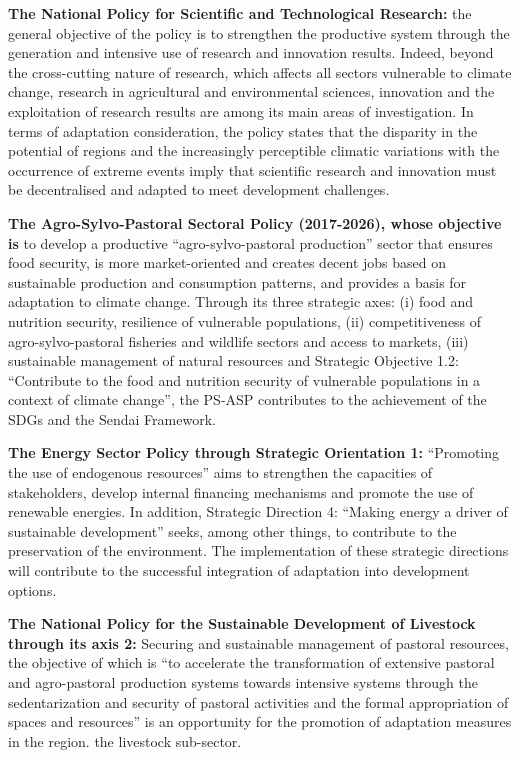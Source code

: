 \documentclass[
]{book}
\begin{document}
\textbf{The National Policy for Scientific and Technological Research:} the general objective of the policy is to strengthen the productive system through the generation and intensive use of research and innovation results. Indeed, beyond the cross-cutting nature of research, which affects all sectors vulnerable to climate change, research in agricultural and environmental sciences, innovation and the exploitation of research results are among its main areas of investigation. In terms of adaptation consideration, the policy states that the disparity in the potential of regions and the increasingly perceptible climatic variations with the occurrence of extreme events imply that scientific research and innovation must be decentralised and adapted to meet development challenges.

\textbf{The Agro-Sylvo-Pastoral Sectoral Policy (2017-2026), whose objective is} to develop a productive ``agro-sylvo-pastoral production'' sector that ensures food security, is more market-oriented and creates decent jobs based on sustainable production and consumption patterns, and provides a basis for adaptation to climate change. Through its three strategic axes: (i) food and nutrition security, resilience of vulnerable populations, (ii) competitiveness of agro-sylvo-pastoral fisheries and wildlife sectors and access to markets, (iii) sustainable management of natural resources and Strategic Objective 1.2: ``Contribute to the food and nutrition security of vulnerable populations in a context of climate change'', the PS-ASP contributes to the achievement of the SDGs and the Sendai Framework.

\textbf{The Energy Sector Policy through Strategic Orientation 1:} ``Promoting the use of endogenous resources'' aims to strengthen the capacities of stakeholders, develop internal financing mechanisms and promote the use of renewable energies. In addition, Strategic Direction 4: ``Making energy a driver of sustainable development'' seeks, among other things, to contribute to the preservation of the environment. The implementation of these strategic directions will contribute to the successful integration of adaptation into development options.

\textbf{The National Policy for the Sustainable Development of Livestock through its axis 2:} Securing and sustainable management of pastoral resources, the objective of which is ``to accelerate the transformation of extensive pastoral and agro-pastoral production systems towards intensive systems through the sedentarization and security of pastoral activities and the formal appropriation of spaces and resources'' is an opportunity for the promotion of adaptation measures in the region. the livestock sub-sector.
\end{document}

